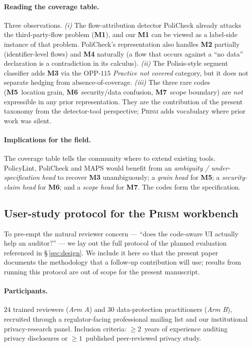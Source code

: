 \documentclass[11pt,a4paper]{article}
\newcommand{\prism}{\textsc{Prism}}
\newcommand{\code}[1]{\textsf{\textbf{#1}}}
\begin{document}
\paragraph{Reading the coverage table.} Three observations.
\emph{(i)} The flow-attribution detector PoliCheck already attacks
the third-party-flow problem (\code{M1}), and our \code{M1} can be
viewed as a label-side instance of that problem. PoliCheck's
representation also handles \code{M2} partially (identifier-level
flows) and \code{M4} naturally (a flow that occurs against a
``no data'' declaration is a contradiction in its calculus).
\emph{(ii)} The Polisis-style segment classifier adds \code{M3} via
the OPP-$115$ \textsl{Practice not covered} category, but it does
not separate hedging from absence-of-coverage. \emph{(iii)} The
three rare codes (\code{M5}~location grain, \code{M6}~security/data
confusion, \code{M7}~scope boundary) are \emph{not} expressible in
any prior representation. They are the contribution of the present
taxonomy from the detector-tool perspective; \prism{} adds vocabulary
where prior work was silent.

\paragraph{Implications for the field.} The coverage table tells the
community where to extend existing tools. PolicyLint, PoliCheck and
MAPS would benefit from an \emph{ambiguity / under-specification
head} to recover \code{M3} unambiguously; a \emph{grain head} for
\code{M5}; a \emph{security-claim head} for \code{M6}; and a
\emph{scope head} for \code{M7}. The codes form the specification.

\subsection{User-study protocol for the \prism{} workbench}\label{sec:userstudy}

To pre-empt the natural reviewer concern --- ``does the code-aware UI
actually help an auditor?'' --- we lay out the full protocol of the
planned evaluation referenced in \S\,\ref{sec:design}. We include it
here so that the present paper documents the methodology that a follow-up
contribution will use; results from running this protocol are out of
scope for the present manuscript.

\paragraph{Participants.} $24$ trained reviewers
(\emph{Arm A}) and $30$ data-protection practitioners
(\emph{Arm B}), recruited through a regulator-facing professional
mailing list and our institutional privacy-research panel. Inclusion
criteria: $\geq 2$~years of experience auditing privacy disclosures or
$\geq 1$~published peer-reviewed privacy study.
\end{document}
